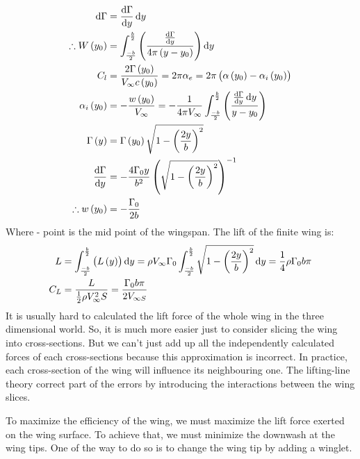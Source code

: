 \documentclass[11pt]{article}
\numberwithin{equation}{section}
\begin{document}
\begin{align}
  \dif \Gamma &= \frac{\dif \Gamma}{\dif y} \dif y\\
  \therefore W\left(y_0\right) &= \int_{\frac{-b}{2}}^{\frac{b}{2}} \left(\frac{\frac{\dif \Gamma}{\dif y}}{4\pi \left(y-y_0\right)}\right) \dif y\\
  C_l &= \frac{2\Gamma\left(y_0\right)}{V_{\infty}c\left(y_0\right)} = 2\pi \alpha_e = 2\pi\left(\alpha\left(y_0\right) - \alpha_i \left(y_0\right)\right)\\
  \alpha_i \left( y_0 \right) &= -\frac{w\left( y_0 \right)}{V_{\infty}} = -\frac{1}{4\pi V_{\infty}} \int_{\frac{-b}{2}}^{\frac{b}{2}} \left( \frac{\frac{\dif \Gamma}{\dif y}\dif y}{y - y_0} \right)\\
  \Gamma \left(y\right) &= \Gamma \left(y_0\right) \sqrt{1 - \left(\frac{2y}{b}\right)^2}\\
  \frac{\dif \Gamma}{\dif y} &= -\frac{4\Gamma_0 y}{b^2} \left(\sqrt{1-\left(\frac{2y}{b}\right)^2}\right)^{-1}\\
  \therefore w\left(y_0\right) &= -\frac{\Gamma_0}{2b}
\end{align}
Where - point is the mid point of the wingspan. The lift of the finite wing is:
\begin{align}
  L &= \int_{\frac{-b}{2}}^{\frac{b}{2}} \left(L\left(y\right)\right)\dif y = \rho V_{\infty} \Gamma_0 \int_{\frac{-b}{2}}^{\frac{b}{2}} \sqrt{1-\left(\frac{2y}{b}\right)^2} \dif y = \frac{1}{4}\rho \Gamma_0 b\pi\\
  C_L &= \frac{L}{\frac{1}{2}\rho V_{\infty}^2 S} = \frac{\Gamma_0 b \pi}{2V_{\infty S}}
\end{align}
It is usually hard to calculated the lift force of the whole wing in the three dimensional world. So, it is much more easier just to consider slicing the wing into cross-sections. But we can’t just add up all the independently calculated forces of each cross-sections because this approximation is incorrect. In practice, each cross-section of the wing will influence its neighbouring one. The lifting-line theory correct part of the errors by introducing the interactions between the wing slices. 

To maximize the efficiency of the wing, we must maximize the lift force exerted on the wing surface. To achieve that, we must minimize the downwash at the wing tips. One of the way to do so is to change the wing tip by adding a winglet.
\end{document}
